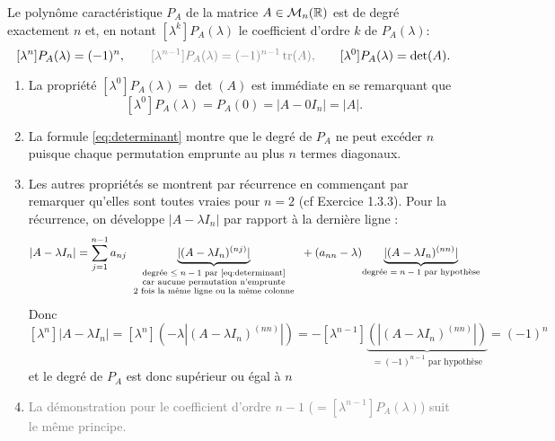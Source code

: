 
\begin{theorem*}
  Le polynôme caractéristique $P_A$ de la matrice $A \in \mathcal{M}_n(\mathbb{R})$ est de degré exactement $n$ et, en notant $[\lambda^k]P_A(\lambda)$ le coefficient d'ordre $k$ de $P_A(\lambda)$:
  $$
  [\lambda^n]P_A(\lambda) = (-1)^n, \qquad
  \textcolor{gray}{[\lambda^{n-1}]P_A(\lambda) = (-1)^{n-1} \tr(A), \qquad}
  [\lambda^0]P_A(\lambda) = \det(A).
  $$
\end{theorem*}

\proof
\begin{enumerate}[\itemdot]
 \item La propriété $[\lambda^0]P_A(\lambda) = \det(A)$ est immédiate en se remarquant que
$$
[\lambda^0]P_A(\lambda) = P_A(0) = |A - 0 I_n| = |A|.
$$
\item La formule \eqref{eq:determinant} montre que le degré de $P_A$ ne peut excéder $n$ puisque chaque permutation emprunte au plus $n$ termes diagonaux.
\item Les autres propriétés se montrent par récurrence en commençant par remarquer qu'elles sont toutes vraies pour $n = 2$ (cf Exercice 1.3.3). Pour la récurrence, on développe $|A - \lambda I_n|$ par rapport à la dernière ligne : 
$$
|A - \lambda I_n| 
= \sum_{j=1}^{n-1} a_{nj} \underset{\scriptsize
  \begin{tabular}{c}\text{degrée $\leq n-1$ par \eqref{eq:determinant}} \\
  \text{car aucune permutation n'emprunte} \\
  \text{2 fois la même ligne ou la même colonne}\end{tabular}
  }{\underbrace{|(A - \lambda I_n)^{(nj)}|}} + (a_{nn} - \lambda) \underset{\text{degrée $= n-1$ par hypothèse}}{\underbrace{|(A - \lambda I_n)^{(nn)}|}}
$$
Donc
$$
[\lambda^n]|A - \lambda I_n| 
= [\lambda^n](-\lambda |(A - \lambda I_n)^{(nn)}|) 
= - [\lambda^{n-1}]\underset{\text{$= (-1)^{n-1}$ par hypothèse}}{\underbrace{(|(A - \lambda I_n)^{(nn)}|)}}
= (-1)^n
$$
et le degré de $P_A$ est donc supérieur ou égal à $n$
\item \textcolor{gray}{La démonstration pour le coefficient d'ordre $n-1$ ($= [\lambda^{n-1}]P_A(\lambda)$) suit le même principe.}
\end{enumerate}
\eproof

